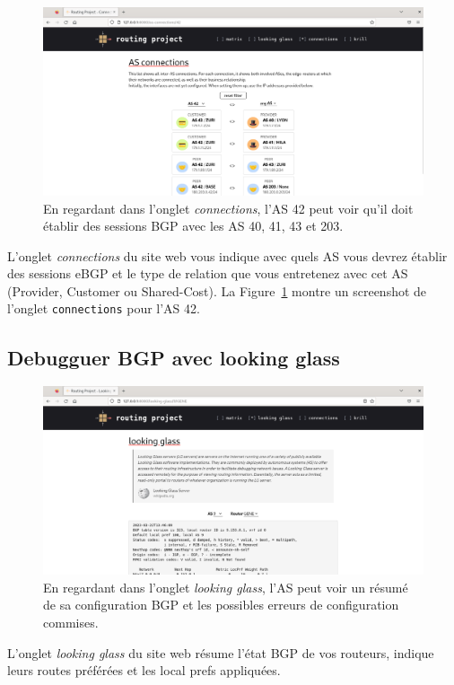 \documentclass[a4paper, 11pt]{article}
\begin{document}
\begin{figure}
    \centering
    \includegraphics[width=0.8\linewidth]{figures/as-connections-screenshot.png}
    \caption{En regardant dans l'onglet \textit{connections}, l'AS 42 peut voir
    qu'il doit établir des sessions BGP avec les AS 40, 41, 43 et 203.}
    \label{fig:as-connections-screenshot}
\end{figure}

L'onglet \textit{connections} du site web vous indique avec quels AS vous
devrez établir des sessions eBGP et le type de relation que vous entretenez
avec cet AS (Provider, Customer ou Shared-Cost). La
Figure~\ref{fig:as-connections-screenshot} montre un screenshot de l'onglet
\texttt{connections} pour l'AS 42.

\subsection{Debugguer BGP avec looking glass}

\begin{figure}
    \centering
    \includegraphics[width=0.8\linewidth]{figures/looking-glass-screenshot.png}
    \caption{En regardant dans l'onglet \textit{looking glass}, l'AS peut voir
    un résumé de sa configuration BGP et les possibles erreurs de configuration
    commises.}
    \label{fig:looking-glass-screenshot}
\end{figure}

L'onglet \textit{looking glass} du site web résume l'état BGP de vos routeurs,
indique leurs routes préférées et les local prefs appliquées.
\end{document}
